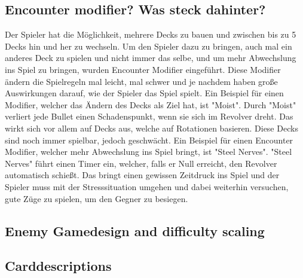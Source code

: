\subsection{Encounter modifier? Was steck dahinter?}\label{subsec:placementMatters}

Der Spieler hat die Möglichkeit, mehrere Decks zu bauen und zwischen bis zu 5 Decks hin und her zu wechseln.
Um den Spieler dazu zu bringen, auch mal ein anderes Deck zu spielen und nicht immer das selbe, und um mehr
Abwechslung ins Spiel zu bringen, wurden Encounter Modifier eingeführt.
Diese Modifier ändern die Spielregeln mal leicht, mal schwer und je nachdem haben große Auswirkungen darauf, wie der Spieler das Spiel spielt.
Ein Beispiel für einen Modifier, welcher das Ändern des Decks als Ziel hat, ist "Moist". Durch "Moist" verliert jede Bullet einen Schadenspunkt, wenn sie sich im Revolver dreht.
Das wirkt sich vor allem auf Decks aus, welche auf Rotationen basieren. Diese Decks sind noch immer spielbar, jedoch geschwächt.
Ein Beispiel für einen Encounter Modifier, welcher mehr Abwechslung ins Spiel bringt, ist "Steel Nerves". "Steel Nerves" führt
einen Timer ein, welcher, falls er Null erreicht, den Revolver automatisch schießt. Das bringt einen gewissen Zeitdruck
ins Spiel und der Spieler muss mit der Stresssituation umgehen und dabei weiterhin versuchen, gute Züge zu spielen, um den Gegner zu besiegen. %

\subsection{Enemy Gamedesign and difficulty scaling}\label{subsec:placementMatters}







\subsection{Carddescriptions}\label{subsec:placementMatters}

